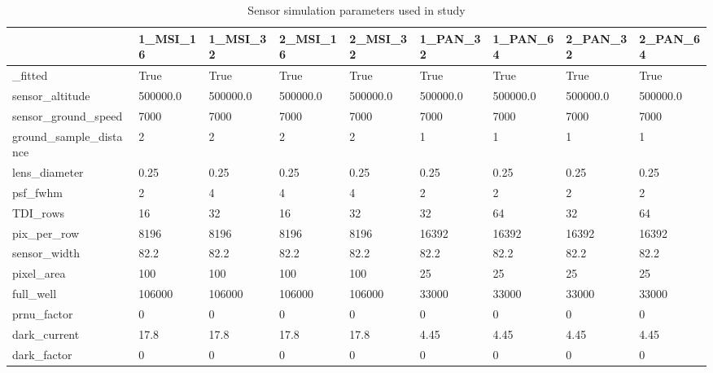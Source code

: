 \begin{table}
\centering
\caption{Sensor simulation parameters used in study}
\label{tab:sim_params}
\begin{tabular}{lllllllll}
\toprule
{} &  1\_MSI\_16 &  1\_MSI\_32 &  2\_MSI\_16 &  2\_MSI\_32 &  1\_PAN\_32 &  1\_PAN\_64 &  2\_PAN\_32 &  2\_PAN\_64 \\
\midrule
\_fitted                &      True &      True &      True &      True &      True &      True &      True &      True \\
sensor\_altitude        &  500000.0 &  500000.0 &  500000.0 &  500000.0 &  500000.0 &  500000.0 &  500000.0 &  500000.0 \\
sensor\_ground\_speed    &      7000 &      7000 &      7000 &      7000 &      7000 &      7000 &      7000 &      7000 \\
ground\_sample\_distance &         2 &         2 &         2 &         2 &         1 &         1 &         1 &         1 \\
lens\_diameter          &      0.25 &      0.25 &      0.25 &      0.25 &      0.25 &      0.25 &      0.25 &      0.25 \\
psf\_fwhm               &         2 &         4 &         4 &         4 &         2 &         2 &         2 &         2 \\
TDI\_rows               &        16 &        32 &        16 &        32 &        32 &        64 &        32 &        64 \\
pix\_per\_row            &      8196 &      8196 &      8196 &      8196 &     16392 &     16392 &     16392 &     16392 \\
sensor\_width           &      82.2 &      82.2 &      82.2 &      82.2 &      82.2 &      82.2 &      82.2 &      82.2 \\
pixel\_area             &       100 &       100 &       100 &       100 &        25 &        25 &        25 &        25 \\
full\_well              &    106000 &    106000 &    106000 &    106000 &     33000 &     33000 &     33000 &     33000 \\
prnu\_factor            &         0 &         0 &         0 &         0 &         0 &         0 &         0 &         0 \\
dark\_current           &      17.8 &      17.8 &      17.8 &      17.8 &      4.45 &      4.45 &      4.45 &      4.45 \\
dark\_factor            &         0 &         0 &         0 &         0 &         0 &         0 &         0 &         0 \\

\end{tabular}
\end{table}
